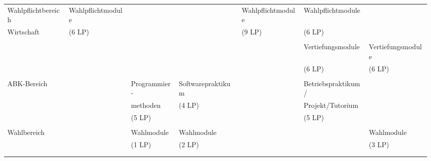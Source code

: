 \begin{center}
\begin{tabular}{||l||l|l|l|l|l|l||}
\hhline{|:=::======:|} Wahlpflichtbereich&Wahlpflichtmodule&&&Wahlpflichtmodule&Wahlpflichtmodule&\\
\hhline{||~||~|~|~|~|~|~||} Wirtschaft&(6 LP)&&&(9 LP)&(6 LP)&\\
\hhline{||~||~|~|~|~|~|~||} &&&&&&\\
\hhline{||~||~|~|~|~|~|~||} &&&&&Vertiefungsmodule&Vertiefungsmodule\\
\hhline{||~||~|~|~|~|~|~||} &&&&&(6 LP)&(6 LP)\\
\hhline{||~||~|~|~|~|~|~||} &&&&&&\\
\hhline{|:=::======:|} ABK-Bereich&&Programmier-&Softwarepraktikum&&Betriebspraktikum/&\\
\hhline{||~||~|~|~|~|~|~||} &&methoden&(4 LP)&&Projekt/Tutorium&\\
\hhline{||~||~|~|~|~|~|~||} &&(5 LP)&&&(5 LP)&\\
\hhline{||~||~|~|~|~|~|~||} &&&&&&\\
\hhline{|:=::======:|} Wahlbereich&&Wahlmodule&Wahlmodule&&&Wahlmodule\\
\hhline{||~||~|~|~|~|~|~||} &&(1 LP)&(2 LP)&&&(3 LP)\\
\hhline{||~||~|~|~|~|~|~||} &&&&&&\\
\hhline{|b:=:b:======:b|}
\end{tabular}
\end{center}
\clearpage
